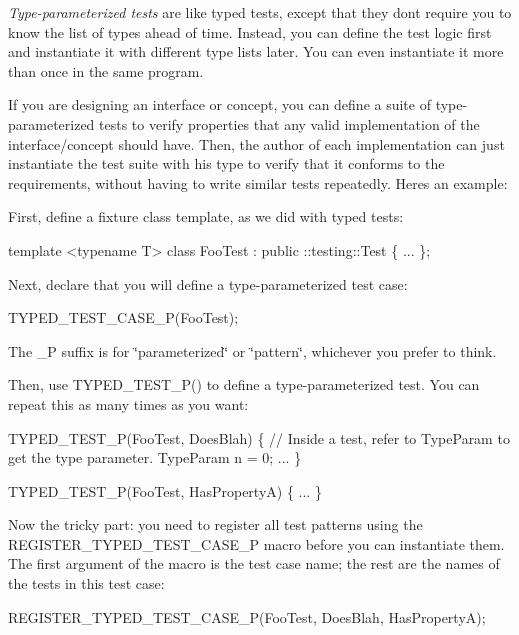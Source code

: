 {\itshape Type-\/parameterized tests} are like typed tests, except that they don\textquotesingle{}t require you to know the list of types ahead of time. Instead, you can define the test logic first and instantiate it with different type lists later. You can even instantiate it more than once in the same program.

If you are designing an interface or concept, you can define a suite of type-\/parameterized tests to verify properties that any valid implementation of the interface/concept should have. Then, the author of each implementation can just instantiate the test suite with his type to verify that it conforms to the requirements, without having to write similar tests repeatedly. Here\textquotesingle{}s an example\+:

First, define a fixture class template, as we did with typed tests\+:


\begin{DoxyCode}
template <typename T>
class FooTest : public ::testing::Test \{
  ...
\};
\end{DoxyCode}


Next, declare that you will define a type-\/parameterized test case\+:


\begin{DoxyCode}
TYPED\_TEST\_CASE\_P(FooTest);
\end{DoxyCode}


The {\ttfamily \+\_\+P} suffix is for \char`\"{}parameterized\char`\"{} or \char`\"{}pattern\char`\"{}, whichever you prefer to think.

Then, use {\ttfamily T\+Y\+P\+E\+D\+\_\+\+T\+E\+S\+T\+\_\+\+P()} to define a type-\/parameterized test. You can repeat this as many times as you want\+:


\begin{DoxyCode}
TYPED\_TEST\_P(FooTest, DoesBlah) \{
  // Inside a test, refer to TypeParam to get the type parameter.
  TypeParam n = 0;
  ...
\}

TYPED\_TEST\_P(FooTest, HasPropertyA) \{ ... \}
\end{DoxyCode}


Now the tricky part\+: you need to register all test patterns using the {\ttfamily R\+E\+G\+I\+S\+T\+E\+R\+\_\+\+T\+Y\+P\+E\+D\+\_\+\+T\+E\+S\+T\+\_\+\+C\+A\+S\+E\+\_\+P} macro before you can instantiate them. The first argument of the macro is the test case name; the rest are the names of the tests in this test case\+:


\begin{DoxyCode}
REGISTER\_TYPED\_TEST\_CASE\_P(FooTest,
                           DoesBlah, HasPropertyA);
\end{DoxyCode}


